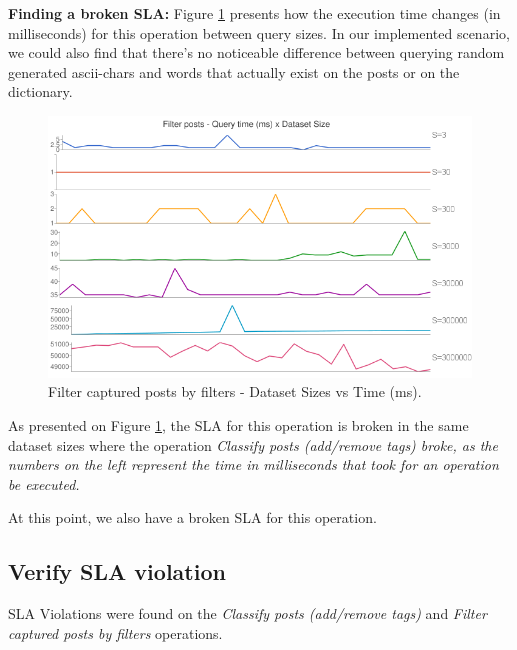 \textbf{Finding a broken SLA: }
Figure \ref{fig:filter-captured-posts-by-filters} presents how the execution time changes (in milliseconds) for this operation between query sizes. In our implemented scenario, we could also find that there's no noticeable difference between querying random generated ascii-chars and words that actually exist on the posts or on the dictionary.

\begin{figure}[ht!]
\centering
\includegraphics[width=120mm]{Imagens/filter-posts-query-time.png}
\caption{Filter captured posts by filters - Dataset Sizes vs Time (ms).\label{fig:filter-captured-posts-by-filters}}
\end{figure}

As presented on Figure \ref{fig:filter-captured-posts-by-filters}, the SLA for this operation is broken in the same dataset sizes where the operation \textit{Classify posts (add/remove tags) broke, as the numbers on the left represent the time in milliseconds that took for an operation be executed.  }

At this point, we also have a broken SLA for this operation. 























\clearpage
\subsection{Verify SLA violation}
SLA Violations were found on the \textit{Classify posts (add/remove tags)} and \textit{Filter captured posts by filters} operations. 


